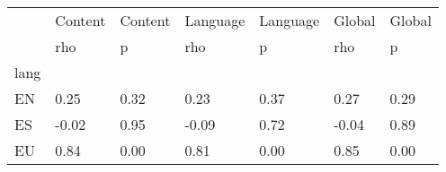 \begin{tabular}{lllllll}
\toprule
 & Content & Content & Language & Language & Global & Global \\
 & rho & p & rho & p & rho & p \\
lang &  &  &  &  &  &  \\
\midrule
EN & 0.25 & 0.32 & 0.23 & 0.37 & 0.27 & 0.29 \\
ES & -0.02 & 0.95 & -0.09 & 0.72 & -0.04 & 0.89 \\
EU & 0.84 & 0.00 & 0.81 & 0.00 & 0.85 & 0.00 \\
\bottomrule
\end{tabular}
